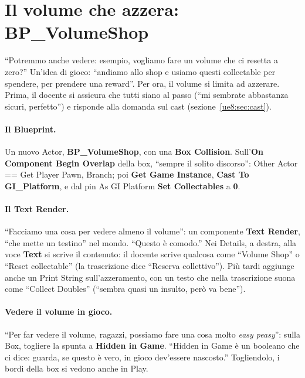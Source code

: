 \section{Il volume che azzera: BP\_VolumeShop}
\label{ue8:sec:shop}

``Potremmo anche vedere: esempio, vogliamo fare un volume che ci resetta a zero?''
Un'idea di gioco: ``andiamo allo shop e usiamo questi collectable per spendere, per
prendere una reward''. Per ora, il volume si limita ad azzerare. Prima, il docente si
assicura che tutti siano al passo (``mi sembrate abbastanza sicuri, perfetto'') e risponde
alla domanda sul cast (sezione~\ref{ue8:sec:cast}).

\paragraph{Il Blueprint.} Un nuovo Actor, \textbf{BP\_VolumeShop}, con una \textbf{Box
Collision}. Sull'\textbf{On Component Begin Overlap} della box, ``sempre il solito
discorso'': Other Actor == Get Player Pawn, Branch; poi \textbf{Get Game Instance},
\textbf{Cast To GI\_Platform}, e dal pin As GI Platform \textbf{Set Collectables} a
\textbf{0}.

\paragraph{Il Text Render.} ``Facciamo una cosa per vedere almeno il volume'': un
componente \textbf{Text Render}, ``che mette un testino'' nel mondo. ``Questo è comodo.''
Nei Details, a destra, alla voce \textbf{Text} si scrive il contenuto: il docente scrive
qualcosa come ``Volume Shop'' o ``Reset collectable'' (la trascrizione dice ``Reserva
collettivo''). Più tardi aggiunge anche un Print String sull'azzeramento, con un testo
che nella trascrizione suona come ``Collect Doubles'' (``sembra quasi un insulto, però va
bene'').

\paragraph{Vedere il volume in gioco.} ``Per far vedere il volume, ragazzi, possiamo fare
una cosa molto \emph{easy peasy}'': sulla Box, togliere la spunta a \textbf{Hidden in
Game}. ``Hidden in Game è un booleano che ci dice: guarda, se questo è vero, in gioco
dev'essere nascosto.'' Togliendolo, i bordi della box si vedono anche in Play.

